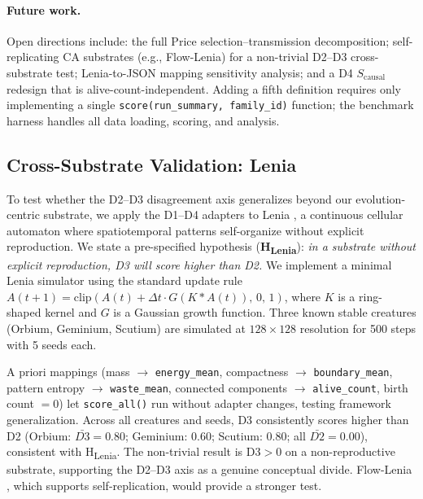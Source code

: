 \documentclass[letterpaper]{article}
\begin{document}
\paragraph{Future work.}
Open directions include: the full Price selection--transmission
decomposition; self-replicating CA substrates (e.g., Flow-Lenia) for a
non-trivial D2--D3 cross-substrate test; Lenia-to-JSON mapping sensitivity
analysis; and a D4 $S_\text{causal}$ redesign that is alive-count-independent.
Adding a fifth definition requires only implementing a single
\texttt{score(run\_summary, family\_id)} function; the benchmark harness
handles all data loading, scoring, and analysis.

\subsection{Cross-Substrate Validation: Lenia}
\label{sec:lenia}

To test whether the D2--D3 disagreement axis generalizes beyond our
evolution-centric substrate, we apply the D1--D4 adapters to Lenia
\citep{chan_2019_lenia}, a continuous cellular automaton where
spatiotemporal patterns self-organize without explicit reproduction.
We state a pre-specified hypothesis
(\textbf{H\textsubscript{Lenia}}): \emph{in a substrate without explicit
reproduction, D3 will score higher than D2.}
We implement a minimal Lenia simulator using the standard update rule
$A(t+1) = \text{clip}(A(t) + \Delta t \cdot G(K \ast A(t)),\, 0,\, 1)$,
where $K$ is a ring-shaped kernel and $G$ is a Gaussian growth function.
Three known stable creatures (Orbium, Geminium, Scutium) are simulated
at $128 \times 128$ resolution for 500 steps with 5 seeds each.

A priori mappings (mass $\to$ \texttt{energy\_mean}, compactness $\to$
\texttt{boundary\_mean}, pattern entropy $\to$ \texttt{waste\_mean},
connected components $\to$ \texttt{alive\_count}, birth count $= 0$)
let \texttt{score\_all()} run without adapter changes, testing framework
generalization.
Across all creatures and seeds, D3 consistently scores higher than D2
(Orbium: $\bar{D3} = 0.80$; Geminium: 0.60; Scutium: 0.80; all
$\bar{D2} = 0.00$), consistent with H\textsubscript{Lenia}.
The non-trivial result is D3$> 0$ on a non-reproductive substrate,
supporting the D2--D3 axis as a genuine conceptual divide.
Flow-Lenia \citep{plantec_2023_flow}, which supports self-replication,
would provide a stronger test.
\end{document}

